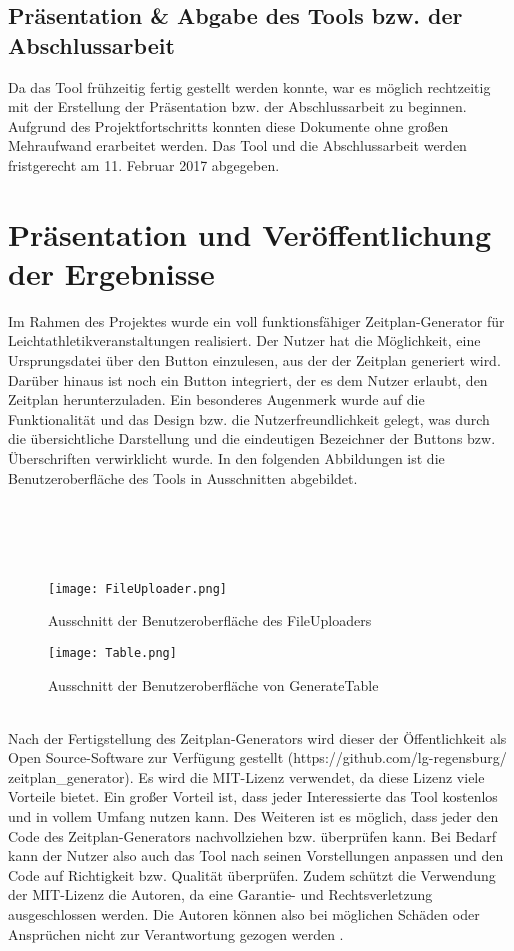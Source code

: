 \subsection{Präsentation \& Abgabe des Tools bzw. der Abschlussarbeit}
Da das Tool frühzeitig fertig gestellt werden konnte, war es möglich rechtzeitig mit der Erstellung der Präsentation bzw. der Abschlussarbeit zu beginnen. Aufgrund des Projektfortschritts konnten diese Dokumente ohne großen Mehraufwand erarbeitet werden. Das Tool und die Abschlussarbeit werden fristgerecht am 11. Februar 2017 abgegeben.

\section{Präsentation und Veröffentlichung der Ergebnisse}
Im Rahmen des Projektes wurde ein voll funktionsfähiger Zeitplan-Generator für Leichtathletikveranstaltungen realisiert. Der Nutzer hat die Möglichkeit, eine Ursprungsdatei über den Button einzulesen, aus der der Zeitplan generiert wird. Darüber hinaus ist noch ein Button integriert, der es dem Nutzer erlaubt, den Zeitplan herunterzuladen. Ein besonderes Augenmerk wurde auf die Funktionalität und das Design bzw. die Nutzerfreundlichkeit gelegt, was durch die übersichtliche Darstellung und die eindeutigen Bezeichner der Buttons bzw. Überschriften verwirklicht wurde. In den folgenden Abbildungen ist die Benutzeroberfläche des Tools in Ausschnitten abgebildet.\\
\\
\\
\\
\\
\begin{figure}[htbp]
  \centering
  \texttt{[image: FileUploader.png]}
  \caption{Ausschnitt der Benutzeroberfläche des FileUploaders}
  \label{fig:Fig1}
\end{figure}
\begin{figure}[htbp]
  \centering
  \texttt{[image: Table.png]}
  \caption{Ausschnitt der Benutzeroberfläche von GenerateTable}
  \label{fig:Fig1}
\end{figure}\\
Nach der Fertigstellung des Zeitplan-Generators wird dieser der Öffentlichkeit als Open Source-Software zur Verfügung gestellt (https://github.com/lg-regensburg/ zeitplan\_generator). Es wird die MIT-Lizenz verwendet, da diese Lizenz viele Vorteile bietet. Ein großer Vorteil ist, dass jeder Interessierte das Tool kostenlos und in vollem Umfang nutzen kann. Des Weiteren ist es möglich, dass jeder den Code des Zeitplan-Generators nachvollziehen bzw. überprüfen kann. Bei Bedarf kann der Nutzer also auch das Tool nach seinen Vorstellungen anpassen und den Code auf Richtigkeit bzw. Qualität überprüfen. Zudem schützt die Verwendung der MIT-Lizenz die Autoren, da eine Garantie- und Rechtsverletzung ausgeschlossen werden. Die Autoren können also bei möglichen Schäden oder Ansprüchen nicht zur Verantwortung gezogen werden \cite{mitlicense}. \\
